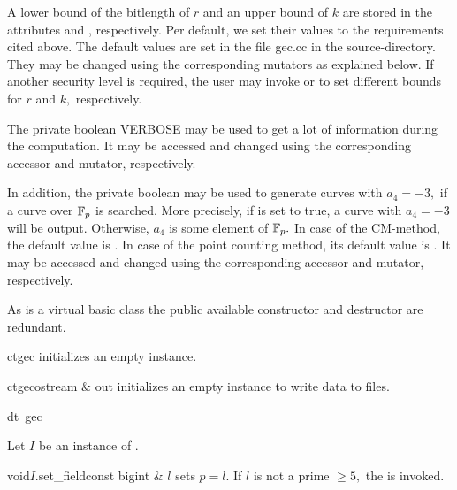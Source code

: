 A lower bound of the bitlength of $r$ and
an upper bound of $k$ are stored in the
attributes  and
, respectively. Per default,
we set their values to the requirements cited above. The default
values are set in the file gec.cc in the source-directory. They
may be changed using the corresponding mutators as explained below. If
another security level is required, the user
may invoke 
or  to set different bounds
for $r$ and $k,$ respectively.

The private boolean VERBOSE may be used
to get a lot of information during the computation. It may
be accessed and changed using the corresponding accessor and
mutator, respectively.

In addition, the private boolean 
may be used to generate curves with $a_4=-3,$ if a curve
over $\mathbb{F}_p$ is searched. More precisely,
if  is set to true, a curve
with $a_4=-3$ will be output. Otherwise, $a_4$ is some element
of $\mathbb{F}_p.$ In case of the CM-method, the default value is
. In case of the point counting method, its default
value is .
It may be accessed and changed using the corresponding accessor and
mutator, respectively.  

As  is a virtual basic class the public available constructor and
destructor are redundant.


\CONS

\begin{fcode}{ct}{gec}{}
  initializes an empty instance.
\end{fcode}

\begin{fcode}{ct}{gec}{ostream & out}
  initializes an empty instance to write data to files.
\end{fcode}

\begin{fcode}{dt}{~gec}{}
\end{fcode}



\ASGN

Let $I$ be an instance of .

\begin{fcode}{void}{$I$.set_field}{const bigint & $l$} 
  sets $p=l.$ If $l$ is not a prime $\geq 5,$ the
   is invoked.
\end{fcode}

